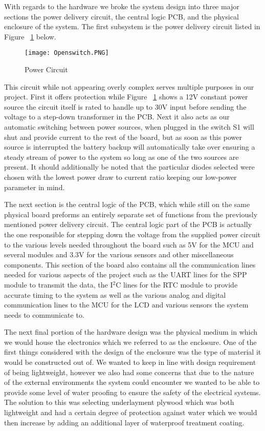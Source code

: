 \documentclass[comsoc, 12pt]{IEEEtran}
\begin{document}
\par With regards to the hardware we broke the system design into three major sections the power delivery circuit, the central logic PCB, and the physical enclosure of the system. The first subsystem is the power delivery circuit listed in Figure ~\ref{fig:Power Circuit} below.
\begin{figure}[!h]
\centering
\texttt{[image: Openswitch.PNG]}
\centering
\caption{Power Circuit}
 \label{fig:Power Circuit}
\end{figure}
This circuit while not appearing overly complex serves multiple purposes in our project. First it offers protection while Figure ~\ref{fig:Power Circuit} shows a 12V constant power source the circuit itself is rated to handle up to 30V input before sending the voltage to a step-down transformer in the PCB. Next it also acts as our automatic switching between power sources, when plugged in the switch S1 will shut and provide current to the rest of the board, but as soon as this power source is interrupted the battery backup will automatically take over ensuring a steady stream of power to the system so long as one of the two sources are present. It should additionally be noted that the particular diodes selected were chosen with the lowest power draw to current ratio keeping our low-power parameter in mind. \par 
The next section is the central logic of the PCB, which while still on the same physical board preforms an entirely separate set of functions from the previously mentioned power delivery circuit. The central logic part of the PCB is actually the one responsible for stepping down the voltage from the supplied power circuit to the various levels needed throughout the board such as 5V for the MCU and several modules and 3.3V for the various sensors and other miscellaneous components. This section of the board also contains all the communication lines needed for various aspects of the project such as the UART lines for the SPP module to transmit the data, the I$^2$C lines for the RTC module to provide accurate timing to the system as well as the various analog and digital communication lines to the MCU for the LCD and various sensors the system needs to communicate to. \par
The next final portion of the hardware design was the physical medium in which we would house the electronics which we referred to as the enclosure. One of the first things considered with the design of the enclosure was the type of material it would be constructed out of. We wanted to keep in line with design requirement of being lightweight, however we also had some concerns that due to the nature of the external environments the system could encounter we wanted to be able to provide some level of water proofing to ensure the safety of the electrical systems. The solution to this was selecting underlayment plywood which was both lightweight and had a certain degree of protection against water which we would then increase by adding an additional layer of waterproof treatment coating. \par 
\end{document}
